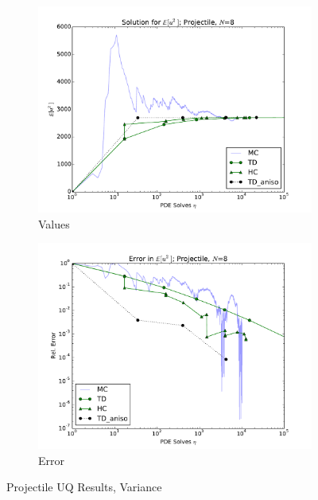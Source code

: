 \documentclass{mc2015}
\begin{document}
\begin{figure}[H]
    \centering
    \begin{subfigure}[b]{0.49 \textwidth}
      \includegraphics[width=\textwidth]{../graphics/projectile_solns_aniso_variance}
      \caption{Values}
      \label{atn vals hdmr}
  \end{subfigure}
\begin{subfigure}[b]{0.49 \textwidth}
\centering
      \includegraphics[width=\textwidth]{../graphics/projectile_errs_aniso_variance}
      \caption{Error}
      \label{atn errs hdmr}
    \end{subfigure}
  \caption{Projectile UQ Results, Variance}
  \label{proj anis variance}
  \end{figure}
\end{document}
